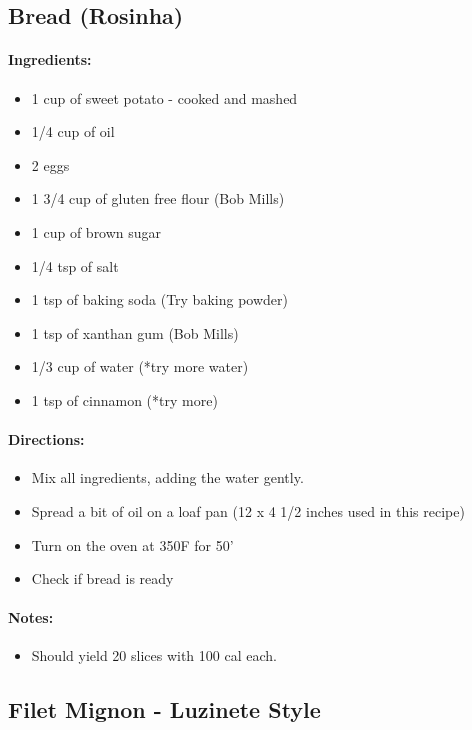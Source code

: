 \documentclass{article}
\begin{document}
\subsection{Bread (Rosinha)}

\paragraph{Ingredients:}
\begin{itemize}
    \item 1 cup of sweet potato - cooked and mashed
    \item 1/4 cup of oil
    \item 2 eggs
    \item 1 3/4 cup of gluten free flour (Bob Mills)
    \item 1 cup of brown sugar
    \item 1/4 tsp of salt
    \item 1 tsp of baking soda (Try baking powder)
    \item 1 tsp of xanthan gum (Bob Mills)
    \item 1/3 cup of water (*try more water)
    \item 1 tsp of cinnamon (*try more)
\end{itemize}

\paragraph{Directions:}
\begin{itemize}
    \item Mix all ingredients, adding the water gently.
    \item Spread a bit of oil on a loaf pan (12 x 4 1/2 inches used in this recipe)
    \item Turn on the oven at 350F for 50'
    \item Check if bread is ready
\end{itemize}

\paragraph{Notes:}
\begin{itemize}
    \item Should yield 20 slices with 100 cal each.
\end{itemize}

\subsection{Filet Mignon - Luzinete Style}
\end{document}
